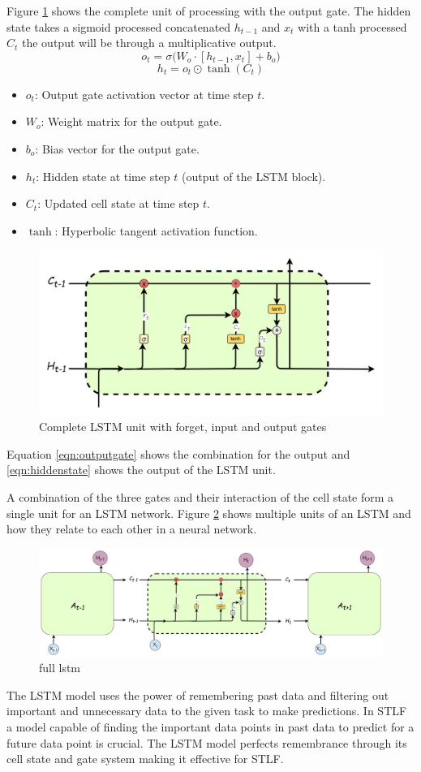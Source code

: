  Figure \ref{fig:forgetinputoutputgates1} shows the complete unit of processing with the output gate. The hidden state takes a sigmoid processed concatenated $h_{t-1}$ and $x_t$ with a tanh processed $C_t$ the output will be through a multiplicative output. 
 \[
 o_t = \sigma \Big( W_o \cdot [h_{t-1}, x_t] + b_o \Big)
 \tag{28}
 \label{eqn:outputgate}
 \]
 \[
 h_t = o_t \odot \tanh(C_t)
 \tag{29}
 \label{eqn:hiddenstate}
 \]
 {\small 
 \begin{itemize}
 	\item $o_t$: Output gate activation vector at time step $t$.
 	\item $W_o$: Weight matrix for the output gate.
 	\item $b_o$: Bias vector for the output gate.
 	\item $h_t$: Hidden state at time step $t$ (output of the LSTM block).
 	\item $C_t$: Updated cell state at time step $t$.
 	\item $\tanh$: Hyperbolic tangent activation function.
 \end{itemize}
}
 \begin{figure}[h]
 	\centering
 	\includegraphics[width=0.5\linewidth]{Chapters/images/forget_input_output_gates1}
 	\caption{Complete LSTM unit with forget, input and output gates }
 	\label{fig:forgetinputoutputgates1}
 \end{figure}
  Equation \ref{eqn:outputgate}  shows the combination for the output and \ref{eqn:hiddenstate} shows the output of the LSTM unit.
  
  A combination of the three gates and their interaction of the cell state form a single unit for an LSTM network. Figure \ref{fig:full-lstm} shows multiple units of an LSTM and how they relate to each other in a neural network. 
 \begin{figure}[h]
 	\centering
 	\includegraphics[width=0.9\linewidth]{"Chapters/images/full lstm"}
 	\caption{full lstm}
 	\label{fig:full-lstm}
 \end{figure}
 The LSTM model uses the power of remembering past data and filtering out important and unnecessary data to the given task to make predictions. In STLF a model capable of finding the important data points in past data to predict for a future data point is crucial. The LSTM model perfects remembrance through its cell state and gate system making it effective for STLF.
 

